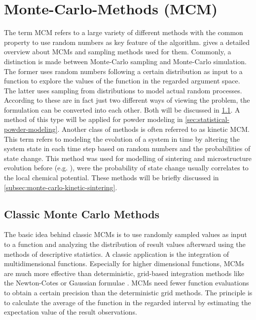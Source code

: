 \section{Monte-Carlo-Methods (MCM)}\label{sec:monte-carlo}

The term \gls{MCM} refers to a large variety of different methods with the common property to use random numbers as key feature of the algorithm.
\textcite{Lemieux2009} gives a detailed overview about \glspl{MCM} and sampling methods used for them.
Commonly, a distinction is made between Monte-Carlo sampling and Monte-Carlo simulation.
The former uses random numbers following a certain distribution as input to a function to explore the values of the function in the regarded argument space.
The latter uses sampling from distributions to model actual random processes.
According to \textcite{Lemieux2009} these are in fact just two different ways of viewing the problem, the formulation can be converted into each other.
Both will be discussed in \cref{subsec:monte-carlo-classic}.
A method of this type will be applied for powder modeling in \cref{sec:statistical-powder-modeling}.
Another class of methods is often referred to as kinetic \gls{MCM}.
This term refers to modeling the evolution of a system in time by altering the system state in each time step based on random numbers and the probabilities of state change.
This method was used for modelling of sintering and microstructure evolution before (e.g. \cite{Braginsky2005, Luque2010, Tikare2003, Wang2018}), were the probability of state change usually correlates to the local chemical potential.
These methods will be briefly discussed in \cref{subsec:monte-carlo-kinetic-sintering}.

\subsection{Classic Monte Carlo Methods}\label{subsec:monte-carlo-classic}

The basic idea behind classic \glspl{MCM} is to use randomly sampled values as input to a function and analyzing the distribution of result values afterward using the methods of descriptive statistics.
A classic application is the integration of multidimensional functions.
Especially for higher dimensional functions, \glspl{MCM} are much more effective than deterministic, grid-based integration methods like the Newton-Cotes or Gaussian formulae \cite{Lemieux2009}.
\glspl{MCM} need fewer function evaluations to obtain a certain precision than the deterministic grid methods.
The principle is to calculate the average of the function in the regarded interval by estimating the expectation value of the result observations.

